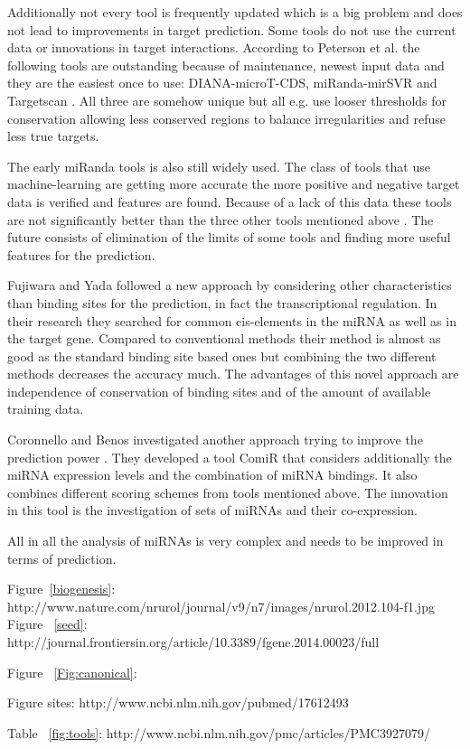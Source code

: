 \documentclass[12pt]{article}
\begin{document}
Additionally not every tool is frequently updated which is a big problem and does not lead to improvements in target prediction. Some tools do not use the current data or innovations in target interactions. According to Peterson et al. the following tools are outstanding because of maintenance, newest input data and they are the easiest once to use: DIANA-microT-CDS, miRanda-mirSVR and Targetscan \cite{Peterson}. All three are somehow unique but all e.g. use looser thresholds for conservation allowing less conserved regions to balance irregularities and refuse less true targets.

The early miRanda tools is also still widely used. The class of tools that use machine-learning are getting more accurate the more positive and negative target data is verified and features are found. Because of a lack of this data these tools are not significantly better than the three other tools mentioned above \cite{Peterson}.
The future consists of elimination of the limits of some tools and finding more useful features for the prediction.

Fujiwara and Yada \cite{Fuji} followed a new approach by considering other characteristics than binding sites for the prediction, in fact the transcriptional regulation. In their research they searched for common cis-elements in the miRNA as well as in the target gene. Compared to conventional methods their method is almost as good as the standard binding site based ones but combining the two different methods decreases the accuracy much. The advantages of this novel approach are independence of conservation of binding sites and of the amount of available training data. 

Coronnello and Benos investigated another approach trying to improve the prediction power \cite{Coronnello}. They developed a tool ComiR that considers additionally the miRNA expression levels and the combination of miRNA bindings. It also combines different scoring schemes from tools mentioned above. The innovation in this tool is the investigation of sets of miRNAs and their co-expression. 

All in all the analysis of miRNAs is very complex and needs to be improved in terms of prediction.


\newpage



\listoffigures


\listoftables


Figure~\ref{biogenesis}: \cite{Kelly} http://www.nature.com/nrurol/journal/v9/n7/images/nrurol.2012.104-f1.jpg
Figure ~\ref{seed}: http://journal.frontiersin.org/article/10.3389/fgene.2014.00023/full

Figure ~\ref{Fig:canonical}: 

Figure sites: http://www.ncbi.nlm.nih.gov/pubmed/17612493

Table ~\ref{fig:tools}: http://www.ncbi.nlm.nih.gov/pmc/articles/PMC3927079/
\end{document}

